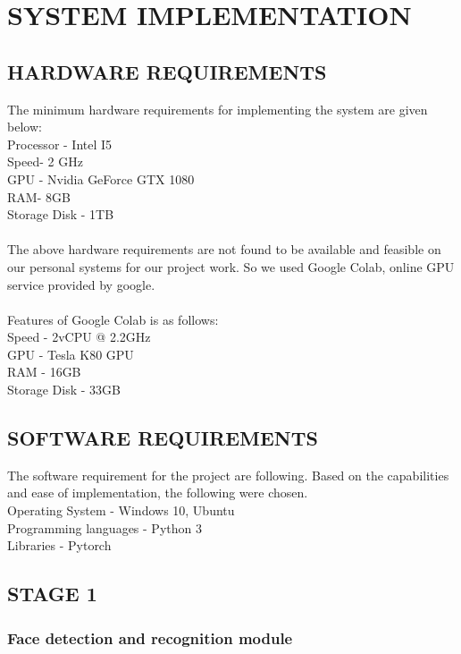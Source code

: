 \documentclass[12pt, a4paper]{report}
\begin{document}
{{{\chapter{SYSTEM IMPLEMENTATION}\vspace{4pt} 

\section{HARDWARE REQUIREMENTS}
\justify \large{The minimum hardware requirements for implementing the system are given below:\\
Processor - Intel I5\\
Speed- 2 GHz\\
GPU - Nvidia GeForce GTX 1080\\
RAM- 8GB\\
Storage Disk - 1TB\\\\
The above hardware requirements are not found to be available and feasible on our personal
systems for our project work. So we used Google Colab, online GPU service provided by google.\\\\
Features of Google Colab is as follows:\\
Speed - 2vCPU @ 2.2GHz\\
GPU - Tesla K80 GPU\\
RAM - 16GB\\
Storage Disk - 33GB\\}

\section{SOFTWARE REQUIREMENTS}
\justify \large{The software requirement for the project are following. Based on the capabilities and ease of
implementation, the following were chosen.\\
Operating System - Windows 10, Ubuntu\\
Programming languages - Python 3\\
Libraries - Pytorch\\}
\section{STAGE 1}
\subsection{Face detection and recognition module}

}}}
\end{document}
